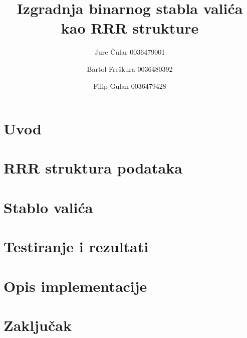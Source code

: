 \documentclass[times, utf8, seminar, numeric]{fer}
\begin{document}
\nocite{*}

\title{Izgradnja binarnog stabla valića kao RRR strukture}

\author{Jure Čular 0036479001 \and 
        Bartol Freškura 0036480392 \and 
        Filip Gulan 0036479428}

\maketitle{}

\tableofcontents

\chapter{Uvod}


\chapter{RRR struktura podataka}


\chapter{Stablo valića}


\chapter{Testiranje i rezultati}


\chapter{Opis implementacije}


\chapter{Zaključak}




\end{document}
